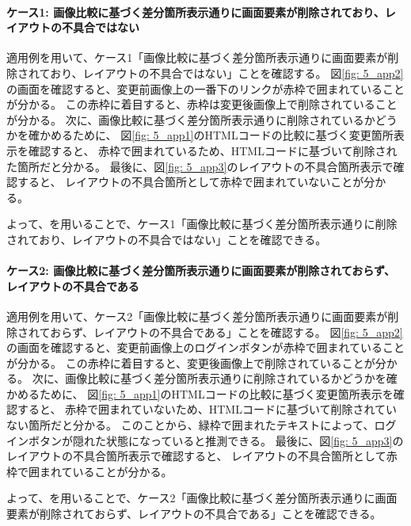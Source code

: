 \paragraph{ケース1: 画像比較に基づく差分箇所表示通りに画面要素が削除されており、レイアウトの不具合ではない}\label{sec:result_area_detection}
適用例を用いて、ケース1「画像比較に基づく差分箇所表示通りに画面要素が削除されており、レイアウトの不具合ではない」ことを確認する。
図\ref{fig: 5_app2}の画面を確認すると、変更前画像上の一番下のリンクが赤枠で囲まれていることが分かる。
この赤枠に着目すると、赤枠は変更後画像上で削除されていることが分かる。
次に、画像比較に基づく差分箇所表示通りに削除されているかどうかを確かめるために、
図\ref{fig: 5_app1}のHTMLコードの比較に基づく変更箇所表示を確認すると、
赤枠で囲まれているため、HTMLコードに基づいて削除された箇所だと分かる。
最後に、図\ref{fig: 5_app3}のレイアウトの不具合箇所表示で確認すると、
レイアウトの不具合箇所として赤枠で囲まれていないことが分かる。
\par
よって、\toolName を用いることで、ケース1「画像比較に基づく差分箇所表示通りに削除されており、レイアウトの不具合ではない」ことを確認できる。



\paragraph{ケース2: 画像比較に基づく差分箇所表示通りに画面要素が削除されておらず、レイアウトの不具合である}\label{sec:result_area2}
適用例を用いて、ケース2「画像比較に基づく差分箇所表示通りに画面要素が削除されておらず、レイアウトの不具合である」ことを確認する。
図\ref{fig: 5_app2}の画面を確認すると、変更前画像上のログインボタンが赤枠で囲まれていることが分かる。
この赤枠に着目すると、変更後画像上で削除されていることが分かる。
次に、画像比較に基づく差分箇所表示通りに削除されているかどうかを確かめるために、
図\ref{fig: 5_app1}のHTMLコードの比較に基づく変更箇所表示を確認すると、
赤枠で囲まれていないため、HTMLコードに基づいて削除されていない箇所だと分かる。
このことから、緑枠で囲まれたテキストによって、ログインボタンが隠れた状態になっていると推測できる。
最後に、図\ref{fig: 5_app3}のレイアウトの不具合箇所表示で確認すると、
レイアウトの不具合箇所として赤枠で囲まれていることが分かる。
\par
よって、\toolName を用いることで、ケース2「画像比較に基づく差分箇所表示通りに画面要素が削除されておらず、レイアウトの不具合である」ことを確認できる。


